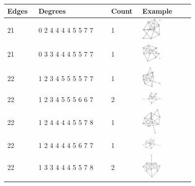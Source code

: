 \begin{table}[h!]
\centering
\begin{tabular}{m{0.15\linewidth} m{0.35\linewidth} m{0.15\linewidth} m{0.25\linewidth}}
 \toprule
    Edges & Degrees & Count & Example\\ [0.5ex]
 \midrule
21 & 0 2 4 4 4 4 5 5 7 7 & 1 & \includegraphics[width=1cm]{15-universal-graphs/img/degree-sequences-example-graphs/graph-5-10-0} \\
21 & 0 3 3 4 4 4 5 5 7 7 & 1 & \includegraphics[width=1cm]{15-universal-graphs/img/degree-sequences-example-graphs/graph-5-10-1} \\
22 & 1 2 3 4 5 5 5 5 7 7 & 1 & \includegraphics[width=1cm]{15-universal-graphs/img/degree-sequences-example-graphs/graph-5-10-2} \\
22 & 1 2 3 4 5 5 5 6 6 7 & 2 & \includegraphics[width=1cm]{15-universal-graphs/img/degree-sequences-example-graphs/graph-5-10-3} \\
22 & 1 2 4 4 4 4 5 5 7 8 & 1 & \includegraphics[width=1cm]{15-universal-graphs/img/degree-sequences-example-graphs/graph-5-10-4} \\
22 & 1 2 4 4 4 4 5 6 7 7 & 1 & \includegraphics[width=1cm]{15-universal-graphs/img/degree-sequences-example-graphs/graph-5-10-5} \\
22 & 1 3 3 4 4 4 5 5 7 8 & 2 & \includegraphics[width=1cm]{15-universal-graphs/img/degree-sequences-example-graphs/graph-5-10-6} \\

\end{tabular}
\end{table}
